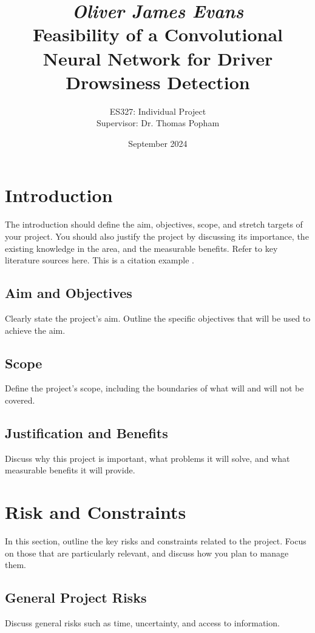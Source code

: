 \documentclass[a4paper, 11pt, twocolumn]{article}
\title{
    \textit{\large Oliver James Evans} \\ %
    \textbf{\LARGE Feasibility of a Convolutional Neural Network for Driver Drowsiness Detection} %
}
\author{
    \normalsize ES327: Individual Project \\ %
    \normalsize Supervisor: Dr. Thomas Popham %
}
\date{
    \normalsize September 2024 %
}
\begin{document}
\maketitle

\onecolumn
\tableofcontents
\twocolumn

\section{Introduction}
\label{sec:introduction}
The introduction should define the aim, objectives, scope, and stretch targets of your project. You should also justify the project by discussing its importance, the existing knowledge in the area, and the measurable benefits. Refer to key literature sources here.
This is a citation example \citep{einstein}.
\subsection{Aim and Objectives}
Clearly state the project's aim. Outline the specific objectives that will be used to achieve the aim.

\subsection{Scope}
Define the project’s scope, including the boundaries of what will and will not be covered.

\subsection{Justification and Benefits}
Discuss why this project is important, what problems it will solve, and what measurable benefits it will provide.

\section{Risk and Constraints}
\label{sec:risks}
In this section, outline the key risks and constraints related to the project. Focus on those that are particularly relevant, and discuss how you plan to manage them.

\subsection{General Project Risks}
Discuss general risks such as time, uncertainty, and access to information.
\end{document}
